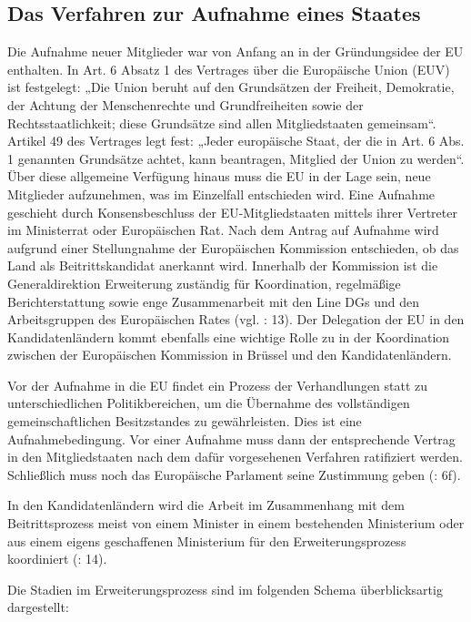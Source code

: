 \subsection{Das Verfahren zur Aufnahme eines Staates }
Die Aufnahme neuer Mitglieder war von Anfang an in der Gründungsidee der EU enthalten. In Art. 6 Absatz 1 des Vertrages über die Europäische Union (EUV) ist festgelegt: „Die Union beruht auf den Grundsätzen der Freiheit, Demokratie, der Achtung der Menschenrechte und Grundfreiheiten sowie der Rechtsstaatlichkeit; diese Grundsätze sind allen Mitgliedstaaten gemeinsam“. Artikel 49 des Vertrages legt fest: „Jeder europäische Staat, der die in Art. 6 Abs. 1 genannten Grundsätze achtet, kann beantragen, Mitglied der Union zu werden“. Über diese allgemeine Verfügung hinaus muss die EU in der Lage sein, neue Mitglieder aufzunehmen, was im Einzelfall entschieden wird. Eine Aufnahme geschieht durch Konsensbeschluss der EU-Mitgliedstaaten mittels ihrer Vertreter im Ministerrat oder Europäischen Rat. Nach dem Antrag auf Aufnahme wird aufgrund einer Stellungnahme der Europäischen Kommission entschieden, ob das Land als Beitrittskandidat anerkannt wird. Innerhalb der Kommission ist die Generaldirektion Erweiterung zuständig für Koordination, regelmäßige Berichterstattung sowie enge Zusammenarbeit mit den Line DGs und den Arbeitsgruppen des Europäischen Rates (vgl. \cite{summa}: 13). Der Delegation der EU in den Kandidatenländern kommt ebenfalls eine wichtige Rolle zu in der Koordination zwischen der Europäischen Kommission in Brüssel und den Kandidatenländern.\par
Vor der Aufnahme in die EU findet ein Prozess der Verhandlungen statt zu unterschiedlichen Politikbereichen, um die Übernahme des vollständigen gemeinschaftlichen Besitzstandes zu gewährleisten. Dies ist eine Aufnahmebedingung. Vor einer Aufnahme muss dann der entsprechende Vertrag in den Mitgliedstaaten nach dem dafür vorgesehenen Verfahren ratifiziert werden. Schließlich muss noch das Europäische Parlament seine Zustimmung geben (\cite{euko07}: 6f).
\par
In den Kandidatenländern wird die Arbeit im Zusammenhang mit dem Beitrittsprozess meist von einem Minister in einem bestehenden Ministerium oder aus einem eigens geschaffenen Ministerium für den Erweiterungsprozess koordiniert (\cite{summa}: 14).\par
Die Stadien im Erweiterungsprozess sind im folgenden Schema überblicksartig dargestellt:
